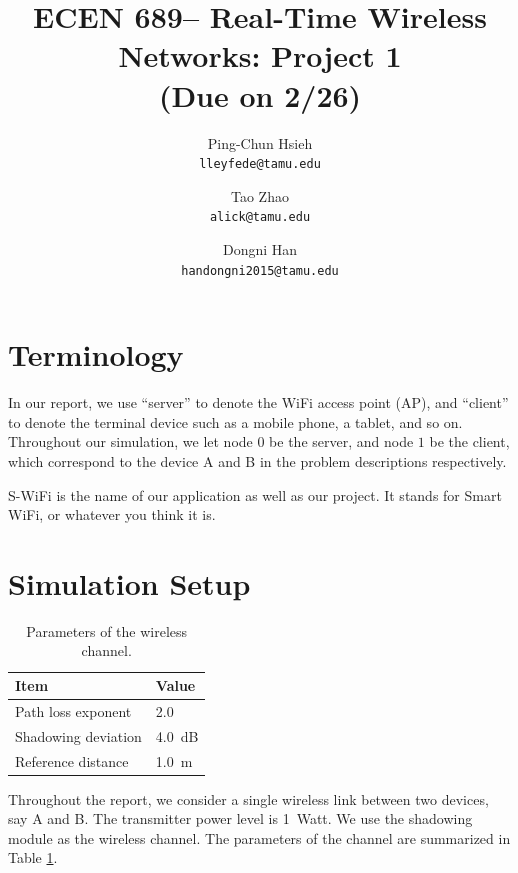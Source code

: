 \documentclass{article}
\begin{document}
\title{\bf ECEN 689-- Real-Time Wireless Networks: Project 1\\ (Due on 2/26)}
\date{}
\author{%
Ping-Chun Hsieh\\
\texttt{lleyfede@tamu.edu}
\and
Tao Zhao\\
\texttt{alick@tamu.edu}
\and
Dongni Han\\
\texttt{handongni2015@tamu.edu}
}
\maketitle

\section*{Terminology}

In our report, we use ``server'' to denote the WiFi access point (AP), and
``client'' to denote the terminal device such as a mobile phone, a tablet, and
so on. Throughout our simulation, we let node $0$ be the server, and node $1$ be
the client, which correspond to the device A and B in the problem descriptions
respectively.

S-WiFi is the name of our application as well as our project. It stands for
Smart WiFi, or whatever you think it is.

\section*{Simulation Setup}
\begin{table}[htbp]
\centering
    \caption{Parameters of the wireless channel.}
    \vspace{2mm}
    \begin{tabular}{ | l | l | }
    \hline
    Item & Value \\ \hline
    Path loss exponent & 2.0  \\ \hline
    Shadowing deviation & \SI{4.0}{dB} \\ \hline
    Reference distance & \SI{1.0}{m} \\
    \hline
\end{tabular}
\label{table: channel}
\end{table}
Throughout the report, we consider a single wireless link between two devices, say A and B. The transmitter power level is \SI{1}{Watt}. We use the shadowing module as the wireless channel. The parameters of the channel are summarized in Table \ref{table: channel}.
\end{document}
